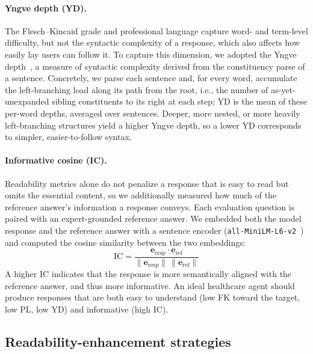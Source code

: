 \paragraph{Yngve depth (YD).}
The Flesch--Kincaid grade and professional language capture word- and term-level difficulty, but not the syntactic complexity of a response, which also affects how easily lay users can follow it.
To capture this dimension, we adopted the Yngve depth~\citep{yngve1960model}, a measure of syntactic complexity derived from the constituency parse of a sentence.
Concretely, we parse each sentence and, for every word, accumulate the left-branching load along its path from the root, i.e., the number of as-yet-unexpanded sibling constituents to its right at each step; YD is the mean of these per-word depths, averaged over sentences.
Deeper, more nested, or more heavily left-branching structures yield a higher Yngve depth, so a lower YD corresponds to simpler, easier-to-follow syntax.

\paragraph{Informative cosine (IC).}
Readability metrics alone do not penalize a response that is easy to read but omits the essential content, so we additionally measured how much of the reference answer's information a response conveys.
Each evaluation question is paired with an expert-grounded reference answer.
We embedded both the model response and the reference answer with a sentence encoder (\texttt{all-MiniLM-L6-v2}~\citep{wang2020minilm}) and computed the cosine similarity between the two embeddings:
\begin{equation}
\label{equ:ic}
    \text{IC} = \frac{\mathbf{e}_{\text{resp}} \cdot \mathbf{e}_{\text{ref}}}{\lVert \mathbf{e}_{\text{resp}} \rVert \, \lVert \mathbf{e}_{\text{ref}} \rVert}
\end{equation}
A higher IC indicates that the response is more semantically aligned with the reference answer, and thus more informative. An ideal healthcare agent should produce responses that are both easy to understand (low FK toward the target, low PL, low YD) and informative (high IC).

\subsection{Readability-enhancement strategies}\label{sec:strategies}

